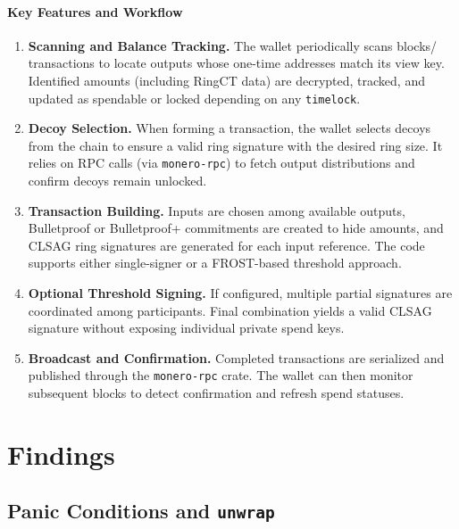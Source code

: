 \documentclass[12pt,a4paper]{article}
\begin{document}
\paragraph{Key Features and Workflow}
\begin{enumerate}
    \item \textbf{Scanning and Balance Tracking.} The wallet periodically scans
    blocks/\\transactions to locate outputs whose one-time addresses match its
    view key. Identified amounts (including RingCT data) are decrypted, tracked,
    and updated as spendable or locked depending on any \texttt{timelock}.

    \item \textbf{Decoy Selection.} When forming a transaction, the wallet
    selects decoys from the chain to ensure a valid ring signature with the
    desired ring size. It relies on RPC calls (via \texttt{monero-rpc}) to fetch
    output distributions and confirm decoys remain unlocked.

    \item \textbf{Transaction Building.} Inputs are chosen among available
    outputs, Bulletproof or Bulletproof+ commitments are created to hide amounts,
    and CLSAG ring signatures are generated for each input reference. The code
    supports either single-signer or a FROST-based threshold approach.

    \item \textbf{Optional Threshold Signing.} If configured, multiple partial
    signatures are coordinated among participants. Final combination yields a
    valid CLSAG signature without exposing individual private spend keys.

    \item \textbf{Broadcast and Confirmation.} Completed transactions are
    serialized and published through the \texttt{monero-rpc} crate. The wallet
    can then monitor subsequent blocks to detect confirmation and refresh spend
    statuses.
\end{enumerate}

\section{Findings}
\label{sec:monero-wallet-findings}

\subsection{Panic Conditions and \texttt{unwrap}}
\label{sec:monero-wallet-unwrap}
\end{document}
